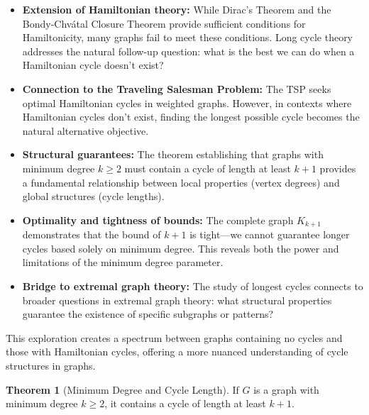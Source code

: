 \documentclass{article}
\theoremstyle{definition}
\newtheorem{theorem}{Theorem}
\begin{document}
\begin{itemize}
    \item \textbf{Extension of Hamiltonian theory:} While Dirac's Theorem and the Bondy-Chvátal Closure Theorem provide sufficient conditions for Hamiltonicity, many graphs fail to meet these conditions. Long cycle theory addresses the natural follow-up question: what is the best we can do when a Hamiltonian cycle doesn't exist?
    
    \item \textbf{Connection to the Traveling Salesman Problem:} The TSP seeks optimal Hamiltonian cycles in weighted graphs. However, in contexts where Hamiltonian cycles don't exist, finding the longest possible cycle becomes the natural alternative objective.
    
    \item \textbf{Structural guarantees:} The theorem establishing that graphs with minimum degree $k \geq 2$ must contain a cycle of length at least $k+1$ provides a fundamental relationship between local properties (vertex degrees) and global structures (cycle lengths).
    
    \item \textbf{Optimality and tightness of bounds:} The complete graph $K_{k+1}$ demonstrates that the bound of $k+1$ is tight—we cannot guarantee longer cycles based solely on minimum degree. This reveals both the power and limitations of the minimum degree parameter.
    
    \item \textbf{Bridge to extremal graph theory:} The study of longest cycles connects to broader questions in extremal graph theory: what structural properties guarantee the existence of specific subgraphs or patterns?
\end{itemize}

This exploration creates a spectrum between graphs containing no cycles and those with Hamiltonian cycles, offering a more nuanced understanding of cycle structures in graphs.

\begin{theorem}[Minimum Degree and Cycle Length]
If $G$ is a graph with minimum degree $k \geq 2$, it contains a cycle of length at least $k+1$.
\end{theorem}
\end{document}
